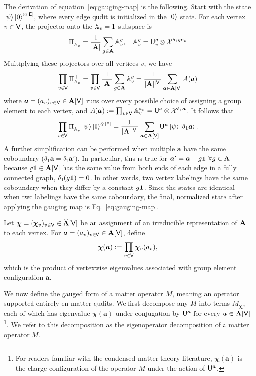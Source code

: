 \documentclass[11pt]{article}
\begin{document}
The derivation of equation~\eqref{eq:gauging-map} is the following.
Start with the state $\ket{\psi}\ket{0}^{\otimes|\mathsf{E}|}$, where every edge qudit is initialized in the $\ket{0}$ state.
For each vertex $v\in \mathsf{V}$, the projector onto the $\mathbb{A}_v=1$ subspace is 
\[
\Pi_{\mathbb{A}_v}^{+} = \frac{1}{|\mathbf{A}|} \sum_{g\in \mathbf{A}} \mathbb{A}_v^g, \quad \mathbb{A}_v^g = \mathsf{U}_v^g \otimes \mathcal{X}^{\delta_1 g \bm{e_v}}
\]
Multiplying these projectors over all vertices $v$, we have
\[
\prod_{v\in \mathsf{V}} \Pi_{\mathbb{A}_v}^{+} = \prod_{v\in \mathsf{V}} \frac{1}{|\mathbf{A}|} \sum_{g\in \mathbf{A}} \mathbb{A}_v^g= \frac{1}{|\mathbf{A}|^{|\mathsf{V}|}}\sum_{\bm{a}\in \mathbf{A}[\mathsf{V}]} A(\bm{a})
\]
where $\bm{a}=(a_v)_{v\in \mathsf{V}}\in \mathbf{A}[\mathsf{V}]$ runs over every possible choice of assigning a group element to each vertex, and $A(\bm{a}):=\prod_{v\in \mathsf{V}} \mathbb{A}_v^{a_v}=\mathsf{U}^{\bm{a}}\otimes \mathcal{X}^{\delta_1\bm{a}}$.
It follows that 
\begin{align}
    \prod_{v\in \mathsf{V}} \Pi_{\mathbb{A}_v}^{+}\ket{\psi}\ket{0}^{\otimes |\mathsf{E}|} = \frac{1}{|\mathbf{A}|^{|\mathsf{V}|}}\sum_{\bm{a}\in \mathbf{A}[\mathsf{V}]}
    \mathsf{U}^{\bm{a}}\ket{\psi}\ket{\delta_1\bm{a}}.
    \label{eq:unsimplified-gauging}
\end{align}
A further simplification can be performed when multiple $\bm{a}$ have the same coboundary ($\delta_1\bm{a}=\delta_{1}\bm{a}'$).
In particular, this is true for $\bm{a}'=\bm{a}+g\mathbf{1} \ \forall g\in \mathbf{A}$ because $g\mathbf{1}\in \mathbf{A}[\mathsf{V}]$ has the same value from both ends of each edge in a fully connected graph, $\delta_1(g\mathbf{1})=0$.
In other words, two vertex labelings have the same coboundary when they differ by a constant $g\mathbf{1}$.
Since the states are identical when two labelings have the same coboundary, the final, normalized state after applying the gauging map is Eq.~\eqref{eq:gauging-map}.

Let $\bm{\bm{\chi}}=(\bm{\chi}_v)_{v\in \mathsf{V}}\in \widehat{\mathbf{A}}[\mathsf{V}]$ be an assignment of an irreducible representation of $\mathbf{A}$ to each vertex.
For $\bm{a}=(a_v)_{v\in\mathsf{V}}\in \mathbf{A}[\mathsf{V}]$, define 
\begin{align}
    \bm{\bm{\chi}}(\bm{a}) :=\prod_{v\in \mathsf{V}} \bm{\chi}_v(a_v),
\end{align}
which is the product of vertexwise eigenvalues associated with group element configuration $\bm{a}$.

We now define the gauged form of a matter operator $M$, meaning an operator supported entirely on matter qudits. We first decompose any $M$ into terms $M_{\bm{\bm{\chi}}}$, each of which has eigenvalue $\bm{\bm{\chi}}(\bm{a})$ under conjugation by $\mathsf{U}^{\bm{a}}$ for every $\bm{a}\in \mathbf{A}[\mathsf{V}]$\footnote{For readers familiar with the condensed matter theory literature, $\bm{\bm{\chi}}(\bm{a})$ is the charge configuration of the operator $M$ under the action of $\mathsf{U}^{\bm{a}}$.}.
We refer to this decomposition as the eigenoperator decomposition of a matter operator $M$.
\end{document}
